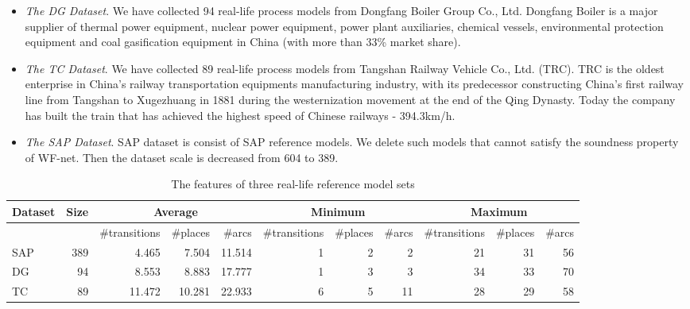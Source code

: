 \documentclass{llncs}
\begin{document}
\begin{itemize}
\item \textit{The DG Dataset}. We have collected 94 real-life process models from Dongfang Boiler Group Co., Ltd. Dongfang Boiler is a major supplier of thermal power equipment, nuclear power equipment, power plant auxiliaries, chemical vessels, environmental protection equipment and coal gasification equipment in China (with more than 33\% market share).
\item \textit{The TC Dataset}. We have collected 89 real-life process models from Tangshan Railway Vehicle Co., Ltd. (TRC). TRC is the oldest enterprise in China’s railway transportation equipments manufacturing industry, with its predecessor constructing China's first railway line from Tangshan to Xugezhuang in 1881 during the westernization movement at the end of the Qing Dynasty. Today the company has built the train that has achieved the highest speed of Chinese railways - 394.3km/h.
\item \textit{The SAP Dataset}. SAP dataset is consist of SAP reference models. We delete such models that cannot satisfy the soundness property of WF-net. Then the dataset scale is decreased from 604 to 389.
\end{itemize}
\begin{table*}[htb]
\caption{The features of three real-life reference model sets \label{dataset}}
\scriptsize
\begin{tabular}{|l|r|r|r|r|r|r|r|r|r|r|}
\hline
   Dataset & Size &\multicolumn{ 3}{|c|}{Average} & \multicolumn{ 3}{|c|}{Minimum} & \multicolumn{ 3}{|c|}{Maximum} \\
\hline
\multicolumn{ 1}{|r|}{} & & \multicolumn{ 1}{|r|}{\#transitions} & \multicolumn{ 1}{|r|}{\#places} & \multicolumn{ 1}{|r|}{\#arcs} & \multicolumn{ 1}{|r|}{\#transitions} & \multicolumn{ 1}{|r|}{\#places} & \multicolumn{ 1}{|r|}{\#arcs} & \multicolumn{ 1}{|r|}{\#transitions} & \multicolumn{ 1}{|r|}{\#places} & \multicolumn{ 1}{|r|}{\#arcs} \\
\hline
SAP & 389 & 4.465 & 7.504 & 11.514 & 1 & 2 & 2 & 21 & 31 & 56 \\
\hline
DG & 94 & 8.553 & 8.883 & 17.777 & 1 & 3 & 3 & 34 & 33 & 70 \\
\hline
TC & 89 & 11.472 & 10.281 & 22.933 & 6 & 5 & 11 & 28 & 29 & 58 \\
\hline
\end{tabular}
\end{table*}
\end{document}

